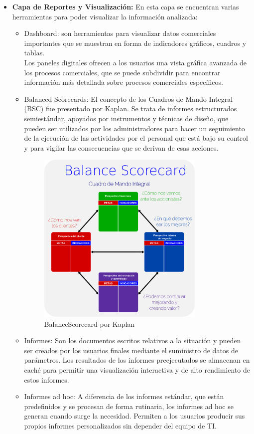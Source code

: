 \documentclass[preprint,12pt]{elsarticle}
\begin{document}
\begin{itemize}
		\item \textbf{Capa de Reportes y Visualización:} En esta capa se encuentran varias herramientas para poder visualizar la información analizada:
		\begin{itemize}
		\item Dashboard: son herramientas para visualizar datos comerciales importantes que se muestran en forma de indicadores gráficos, cuadros y tablas. \\Los paneles digitales ofrecen a los usuarios una vista gráfica avanzada de los procesos comerciales, que se puede subdividir para encontrar información más detallada sobre procesos comerciales específicos.
		\item Balanced Scorecards: El concepto de los Cuadros de Mando Integral (BSC) fue presentado por Kaplan. Se trata de informes estructurados semiestándar, apoyados por instrumentos y técnicas de diseño, que pueden ser utilizados por los administradores para hacer un seguimiento de la ejecución de las actividades por el personal que está bajo su control y para vigilar las consecuencias que se derivan de esas acciones. 
\begin{figure}[htb]
	\begin{center}
		\includegraphics[width=8cm]{./IMAGENES/BalanceScorecard} 
		\caption{BalanceScorecard por Kaplan}
	\end{center}
\end{figure}


		\item Informes: Son los documentos escritos relativos a la situación y pueden ser creados por los usuarios finales mediante el suministro de datos de parámetros. Los resultados de los informes preejecutados se almacenan en caché para permitir una visualización interactiva y de alto rendimiento de estos informes.
		\item Informes ad hoc: A diferencia de los informes estándar, que están predefinidos y se procesan de forma rutinaria, los informes ad hoc se generan cuando surge la necesidad. Permiten a los usuarios producir sus propios informes personalizados sin depender del equipo de TI.
		\end{itemize}

	\end{itemize}
	
\end{document}
